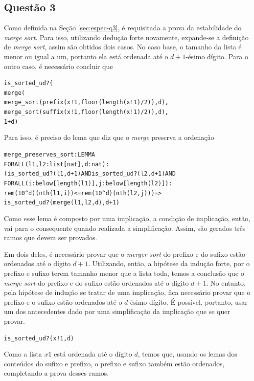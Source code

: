 \documentclass[a4paper, 12pt]{article}
\begin{document}
\subsection{Questão 3}
\label{sec:sol-q3}
    Como definida na Seção \ref{sec:espec-q3}, é requisitada a prova da estabilidade do \textit{merge sort}. Para isso, utilizando dedução forte novamente, expande-se a definição de \textit{merge sort}, assim são obtidos dois casos. No caso base, o tamanho da lista é menor ou igual a um, portanto ela está ordenada até o $d + 1$-ésimo dígito. Para o outro caso, é necessário concluir que
    \begin{alltt}
is_sorted_ud?(
    merge(
        merge_sort(prefix(x!1, floor(length(x!1) / 2)), d), 
        merge_sort(suffix(x!1, floor(length(x!1) / 2)), d), 
     1 + d)
    \end{alltt}
    Para isso, é preciso do lema que diz que o \textit{merge} preserva a ordenação
    \begin{alltt}
merge_preserves_sort : LEMMA
    FORALL(l1,l2 : list[nat], d : nat):
    (is_sorted_ud?(l1,d+1) AND is_sorted_ud?(l2,d+1) AND
        FORALL(i:below[length(l1)], j:below[length(l2)]) :
        rem(10^d)(nth(l1,i))  <= rem(10^d)(nth(l2,j)) )  =>
        is_sorted_ud?(merge(l1,l2,d),d+1)
    \end{alltt}
    Como esse lema é composto por uma implicação, a condição de implicação, então, vai para o consequente quando realizada a simplificação. Assim, são gerados três ramos que devem ser provados.
    
    Em dois deles, é necessário provar que o \textit{merger sort} do prefixo e do sufixo estão ordenados até o dígito $d + 1$. Utilizando, então, a hipótese da indução forte, por o prefixo e sufixo terem tamanho menor que a lista toda, temos a conclusão que o \textit{merge sort} do prefixo e do sufixo estão ordenados até o dígito $d + 1$. No entanto, pela hipótese de indução se tratar de uma implicação, fica necessário provar que o prefixo e o sufixo estão ordenados até o $d$-ésimo dígito. É possível, portanto, usar um dos antecedentes dado por uma simplificação da implicação que se quer provar.
   \begin{alltt}
    is_sorted_ud?(x!1, d)
    \end{alltt}
    Como a lista $x1$ está ordenada até o dígito $d$, temos que, usando os lemas dos conteúdos do sufixo e prefixo, o prefixo e sufixo também estão ordenados, completando a prova desses ramos. 
    
\end{document}
